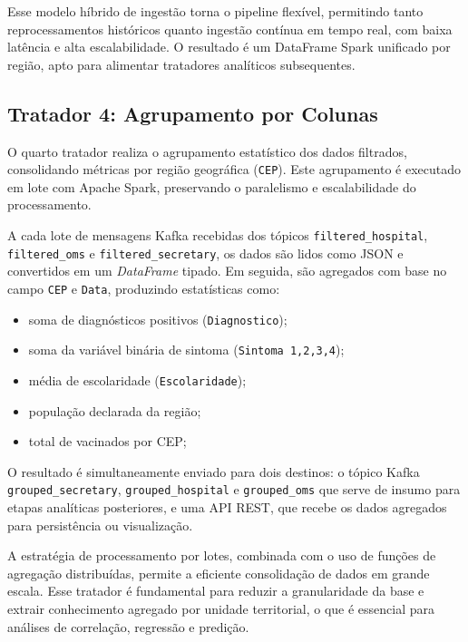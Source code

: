\documentclass[a4paper,12pt]{article}
\begin{document}
Esse modelo híbrido de ingestão torna o pipeline flexível, permitindo tanto reprocessamentos históricos quanto ingestão contínua em tempo real, com baixa latência e alta escalabilidade. O resultado é um DataFrame Spark unificado por região, apto para alimentar tratadores analíticos subsequentes.



\subsection{Tratador 4: Agrupamento por Colunas}

O quarto tratador realiza o agrupamento estatístico dos dados filtrados, consolidando métricas por região geográfica (\texttt{CEP}). Este agrupamento é executado em lote com Apache Spark, preservando o paralelismo e escalabilidade do processamento.

A cada lote de mensagens Kafka recebidas dos tópicos \texttt{filtered\_hospital},  \texttt{filtered\_oms} e  \texttt{filtered\_secretary}, os dados são lidos como JSON e convertidos em um \textit{DataFrame} tipado. Em seguida, são agregados com base no campo \texttt{CEP} e \texttt{Data}, produzindo estatísticas como:
\begin{itemize}
    \item soma de diagnósticos positivos (\texttt{Diagnostico});
    \item soma da variável binária de sintoma (\texttt{Sintoma 1,2,3,4});
    \item média de escolaridade (\texttt{Escolaridade});
    \item população declarada da região;
    \item total de vacinados por CEP;
\end{itemize}

O resultado é simultaneamente enviado para dois destinos: o tópico Kafka \texttt{grouped\_secretary}, \texttt{grouped\_hospital} e \texttt{grouped\_oms} que serve de insumo para etapas analíticas posteriores, e uma API REST, que recebe os dados agregados para persistência ou visualização.

A estratégia de processamento por lotes, combinada com o uso de funções de agregação distribuídas, permite a eficiente consolidação de dados em grande escala. Esse tratador é fundamental para reduzir a granularidade da base e extrair conhecimento agregado por unidade territorial, o que é essencial para análises de correlação, regressão e predição.
\end{document}
